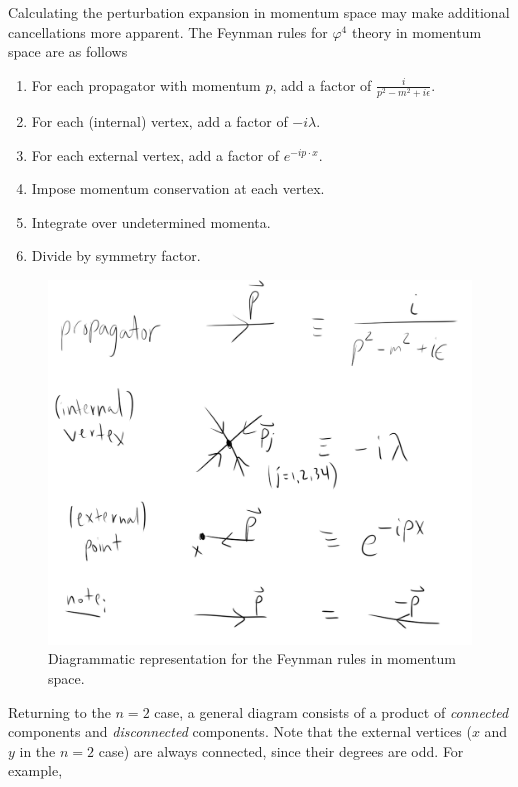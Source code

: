 \noindent Calculating the perturbation expansion in momentum space may make additional cancellations more apparent. The Feynman rules for $\varphi^4$ theory in momentum space are as follows
\begin{enumerate}
\item For each propagator with momentum $p$, add a factor of $\frac{i}{p^2-m^2+i\epsilon}$.
\item For each (internal) vertex, add a factor of $-i\lambda$.
\item For each external vertex, add a factor of $e^{-ip\cdot x}$.
\item Impose momentum conservation at each vertex.
\item Integrate over undetermined momenta.
\item Divide by symmetry factor.
\end{enumerate}

\begin{figure}[H]
	\centering
	\includegraphics[scale=0.6]{images/feynmanmom.png}
	\caption{Diagrammatic representation for the Feynman rules in momentum space.}
\end{figure}

\noindent Returning to the $n=2$ case, a general diagram consists of a product of \textit{connected} components and \textit{disconnected} components. Note that the external vertices ($x$ and $y$ in the $n=2$ case) are always connected, since their degrees are odd. For example,

